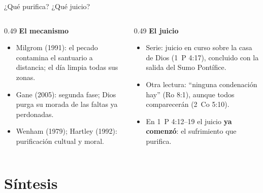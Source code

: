 \documentclass[hyperref={bookmarks=false},aspectratio=169]{beamer}
\newcommand{\destacar}[1]{\textbf{\textcolor{tierraroja}{#1}}}
\begin{document}
\begin{frame}{¿Qué purifica? ¿Qué juicio?}
\begin{columns}[t,onlytextwidth]
\begin{column}{0.49\textwidth}\scriptsize
\destacar{El mecanismo}
\begin{itemize}
\item Milgrom (1991): el pecado contamina el santuario a distancia; el día limpia todas sus zonas.
\item Gane (2005): segunda fase; Dios purga su morada de las faltas ya perdonadas.
\item Wenham (1979); Hartley (1992): purificación cultual y moral.
\end{itemize}
\end{column}
\begin{column}{0.49\textwidth}\scriptsize
\destacar{El juicio}
\begin{itemize}
\item Serie: juicio en curso sobre la casa de Dios (1~P 4:17), concluido con la salida del Sumo Pontífice.
\item Otra lectura: ``ninguna condenación hay'' (Ro 8:1), aunque todos comparecerán (2~Co 5:10).
\item En 1~P 4:12--19 el juicio \destacar{ya comenzó}: el sufrimiento que purifica.
\end{itemize}
\end{column}
\end{columns}
\end{frame}

\section{Síntesis}
\end{document}
